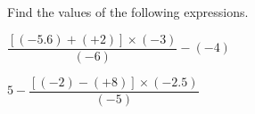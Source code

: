  Find the values of the following expressions.

\begin{subparts}
  \item $\dfrac{[(-5.6)+(+2)]\times(-3)}{(-6)}-(-4)$

  \item $5-\dfrac{[(-2)-(+8)]\times(-2.5)}{(-5)}$
\end{subparts}

